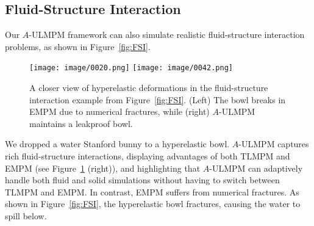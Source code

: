 \subsection{Fluid-Structure Interaction}

Our $A$-ULMPM framework can also simulate realistic fluid-structure interaction problems, as shown in Figure~\ref{fig:FSI}.
\begin{figure}[h!]
\vspace{-4mm}
    \centering
    \texttt{[image: image/0020.png]}
    \texttt{[image: image/0042.png]}
    \vspace{-3mm}
    \caption{A closer view of hyperelastic deformations in the fluid-structure interaction example from Figure~\ref{fig:FSI}. (Left) The bowl breaks in EMPM due to numerical fractures, while (right) $A$-ULMPM maintains a leakproof bowl. }
        \vspace{-5mm}
    \label{fig:fsi_zoom_in}
\end{figure}
\vspace{1.5mm}
We dropped a water Stanford bunny to a hyperelastic bowl. $A$-ULMPM captures rich fluid-structure interactions, displaying advantages of both TLMPM and EMPM (see Figure~\ref{fig:fsi_zoom_in} (right)), and highlighting that $A$-ULMPM can adaptively handle both fluid and solid simulations without having to switch between TLMPM and EMPM.
In contrast, EMPM suffers from numerical fractures. As shown in Figure~\ref{fig:FSI}, the hyperelastic bowl fractures, causing the water to spill below.
